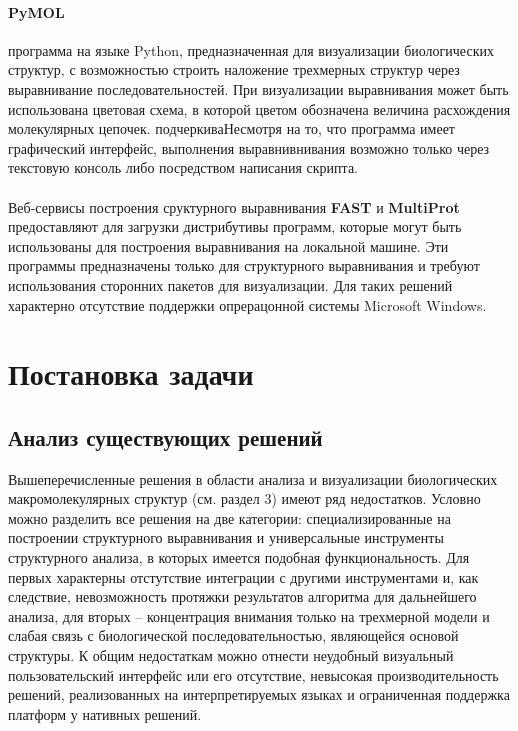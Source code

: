 \documentclass[a4paper, 12pt, titlepage, utf8]{extarticle}
\let\oldsection\section         %
\renewcommand{\section}{\newpage\oldsection}
\begin{document}
\paragraph{PyMOL \cite{pymol}}
программа на языке Python, предназначенная для визуализации биологических структур, с возможностью строить наложение трехмерных структур через выравнивание последовательностей. При визуализации выравнивания может быть использована цветовая схема, в которой цветом обозначена величина расхождения молекулярных цепочек. подчеркиваНесмотря на то, что программа имеет графический интерфейс, выполнения выравнивнивания возможно только через текстовую консоль либо посредством написания скрипта.
 
\paragraph{}
Веб-сервисы построения сруктурного выравнивания \textbf{FAST} и \textbf{MultiProt} предоставляют для загрузки дистрибутивы программ, которые могут быть использованы для построения выравнивания на локальной машине. Эти программы предназначены только для структурного выравнивания и требуют использования сторонних пакетов для визуализации. Для таких решений характерно отсутствие поддержки опрерацонной системы Microsoft Windows.


\section{Постановка задачи}	%

\subsection{Анализ существующих решений}
Вышеперечисленные решения в области анализа и визуализации биологических макромолекулярных структур (см. раздел 3) имеют ряд недостатков. Условно можно разделить все решения на две категории: специализированные на построении структурного выравнивания и универсальные инструменты структурного анализа, в которых имеется подобная функциональность. Для первых характерны отстутствие интеграции с другими инструментами и, как следствие, невозможность протяжки результатов алгоритма для дальнейшего анализа, для вторых -- концентрация внимания только на трехмерной модели и слабая связь с биологической последовательностью, являющейся основой структуры. К общим недостаткам можно отнести неудобный визуальный пользовательский интерфейс или его отсутствие, невысокая производительность решений, реализованных на интерпретируемых языках и ограниченная поддержка платформ у нативных решений.
\end{document}

